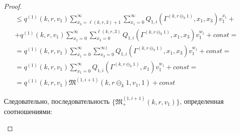 \documentclass[a4paper,12pt,russian]{extarticle}
\begin{document}
\begin{proof}
\begin{multline*}
     \leqslant q^{(1)}(k,r,v_1) \sum_{x_3=\ell(k,r,3)+1}^{\infty} \sum_{x_1=0}^{\infty} Q_{1,i}(\Gamma^{(k, r\ominus_{k}1)},x_1, x_3) v_1^{x_1} + \\+
     q^{(1)}(k,r,v_1) \sum_{x_1=0}^{\infty}  \sum_{x_3=0}^{\ell(k,r,3)}Q_{1,i}(\Gamma^{(k,r\ominus_k 1)},x_1, x_3) v_1^{w_1} +const = \\
     = q^{(1)}(k,r,v_1) \sum_{x_1=0}^{\infty}  \sum_{x_3=0}^{\infty)}Q_{1,i}(\Gamma^{(k,r\ominus_k 1)},x_1, x_3) v_1^{w_1}  + const =\\=
      q^{(1)}(k,r,v_1) \sum_{x_1=0}^{\infty}  Q_{1,i}(\Gamma^{(k,r\ominus_k 1)},x_1) v_1^{w_1} + const = \\
      =  q^{(1)}(k,r,v_1) \mathfrak{M}^{(1,i+1)}(k,r\ominus_k 1,v_1,1) + const
\end{multline*}

Следовательно, последовательность $\{\mathfrak{M}_+^{(1,i+1)}(k,r,v_1)\}$, определенная соотношениями:
\begin{enumerate}


\end{enumerate}
\end{proof}
\end{document}
